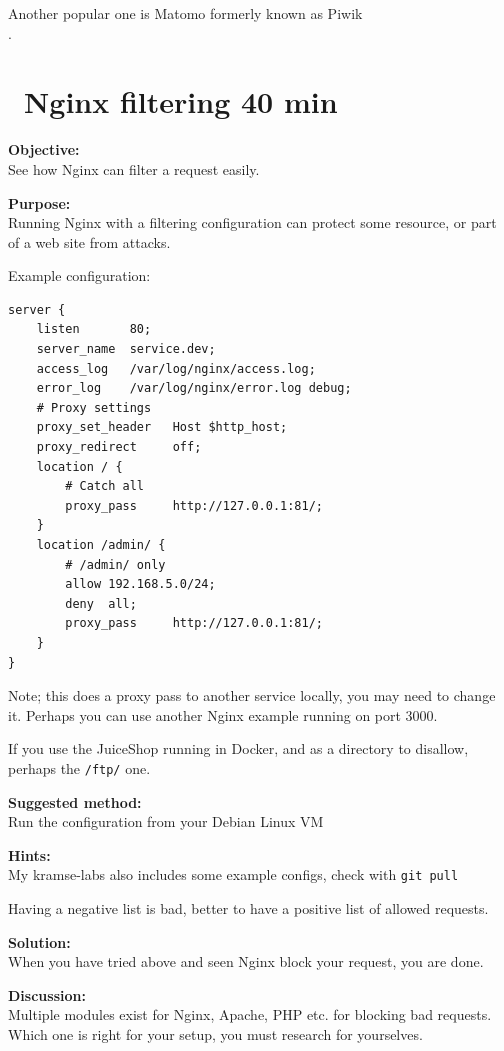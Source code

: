 \documentclass[a4paper,11pt,notitlepage]{report}
\begin{document}
Another popular one is Matomo formerly known as Piwik\\
.


\chapter{\faExclamationTriangle\ Nginx filtering 40 min}
\label{ex:nginx-filtering}

{\bf Objective:}\\
See how Nginx can filter a request easily.


{\bf Purpose:}\\
Running Nginx with a filtering configuration can protect some resource, or part of a web site from attacks.

Example configuration:
\begin{verbatim}
server {
    listen       80;
    server_name  service.dev;
    access_log   /var/log/nginx/access.log;
    error_log    /var/log/nginx/error.log debug;
    # Proxy settings
    proxy_set_header   Host $http_host;
    proxy_redirect     off;
    location / {
        # Catch all
        proxy_pass     http://127.0.0.1:81/;
    }
    location /admin/ {
        # /admin/ only
        allow 192.168.5.0/24;
        deny  all;
        proxy_pass     http://127.0.0.1:81/;
    }
}
\end{verbatim}

Note; this does a proxy pass to another service locally, you may need to change it. Perhaps you can use another Nginx example running on port 3000.

If you use the JuiceShop running in Docker, and as a directory to disallow, perhaps the \verb+/ftp/+ one.

{\bf Suggested method:}\\
Run the configuration from your Debian Linux VM


{\bf Hints:}\\
My kramse-labs also includes some example configs, check with \verb+git pull+

Having a negative list is bad, better to have a positive list of allowed requests.

{\bf Solution:}\\
When you have tried above and seen Nginx block your request, you are done.

{\bf Discussion:}\\
Multiple modules exist for Nginx, Apache, PHP etc. for blocking bad requests.
Which one is right for your setup, you must research for yourselves.
\end{document}
